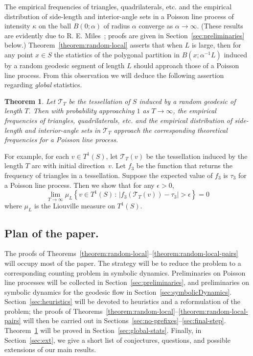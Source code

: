 \documentclass[10pt]{amsart}
\newtheorem{theo}{Theorem}[section]
\theoremstyle{definition}\newtheorem{defi}[theo]{Definition}\newtheorem{rema}[theo]{Remark}\newtheorem{exam}[theo]{Example}\newtheorem{exem}[theo]{Example}\newtheorem{nota}[theo]{Notation}
\begin{document}
The empirical frequencies of triangles, quadrilaterals, etc. and the empirical distribution of side-length and interior-angle sets in a Poisson line process of intensity $\kappa$ on the ball $B (0; \alpha)$ of radius $\alpha$ converge as $\alpha \rightarrow \infty$. (These results are evidently due to R. E. Miles~\cite{miles:pnas1,miles:pnas2}; proofs are given in Section~\ref{sec:preliminaries} below.) Theorem~\ref{theorem:random-local} asserts that when $L$ is large, then for any point $x\in S$ the statistics of the polygonal partition in $B (x;\alpha^{-1}L)$ induced by a random geodesic segment of length $L$ should approach those of a Poisson line process. From this observation we will deduce the following assertion regarding \emph{global} statistics.



\begin{theo}\label{theorem:global-stats}
Let $\mathcal{T}_{T}$ be the tessellation of $S$ induced by a random geodesic of length $T$. Then with probability approaching $1$ as $T \rightarrow \infty$, the empirical frequencies of triangles, quadrilaterals, etc. and the empirical distribution of side-length and interior-angle sets in $\mathcal{T}_{T}$ approach the corresponding theoretical frequencies for a Poisson line process.
\end{theo}


For example, for each $v \in T^1(S)$, let $\mathcal T_T(v)$ be the tessellation induced by the length $T$ arc with initial direction~$v$. Let $f_3$ be the function that returns the frequency of triangles in a tessellation. Suppose the expected value of $f_3$ is $\tau_3$ for a Poisson line process. Then we show that for any $\epsilon > 0$,
\[
\lim_{T \to \infty} \mu_L \left\{v \in T^1(S) \,:\, |f_3(\mathcal T_T(v)) - \tau_3| > \epsilon\right\} = 0
\]
where $\mu_L$ is the Liouville measure on $T^1(S)$.

\subsection*{Plan of the paper.}
The proofs of Theorems~\ref{theorem:random-local}--\ref{theorem:random-local-pairs} will occupy most of the paper. The strategy will be to reduce the problem to a corresponding counting problem in symbolic dynamics. Preliminaries on Poisson line processes will be collected in Section~\ref{sec:preliminaries}, and preliminaries on symbolic dynamics for the geodesic flow in Section~\ref{sec:symbolicDynamics}. Section~\ref{sec:heuristics} will be devoted to heuristics and a reformulation of the problem; the proofs of Theorems~\ref{theorem:random-local}--\ref{theorem:random-local-pairs} will then be carried out in Sections~\ref{sec:no-prefixes}--\ref{sec:final-step}. Theorem~\ref{theorem:global-stats} will be proved in Section~\ref{sec:global-stats}. Finally, in Section~\ref{sec:ext}, we give a short list of conjectures, questions, and possible extensions of our main results.
\end{document}
